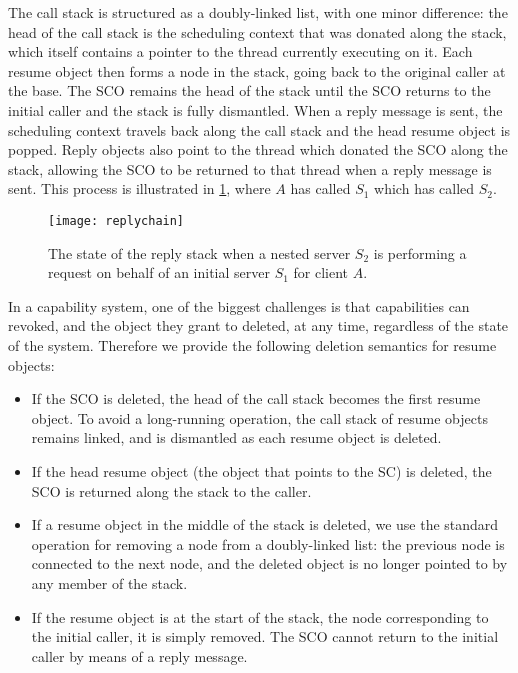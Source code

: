 The call stack is structured as a doubly-linked list, with one minor difference: the head of the
call stack is the scheduling context that was donated along the stack, which itself contains a
pointer to the thread currently executing on it. Each resume object then forms a node in the
stack, going back to the original caller at the base. The \gls{SCO} remains the head of the stack
until the \gls{SCO} returns to the initial caller and the stack is fully dismantled.  When a reply
message is sent, the scheduling context travels back along the call stack and the head resume object
is popped.  Reply objects also point to the thread which donated the \gls{SCO} along the stack,
allowing the SCO to be returned to that thread when a reply message is sent.  This process is
illustrated in \cref{f:reply-stack}, where $A$ has called $S_{1}$ which has called  $S_{2}$.

\begin{figure}[t]
    \centering
    \texttt{[image: replychain]}
    \caption[Reply stack example]{The state of the reply stack when a nested server $S_{2}$ is
performing a request on behalf of an initial server $S_{1}$ for client $A$.}
    \label{f:reply-stack}
\end{figure}

In a capability system, one of the biggest challenges is that capabilities can revoked, and the
object they grant to deleted, at any time, regardless of the state of the system. Therefore
we provide the following deletion semantics for resume objects:

\begin{itemize}
    \item If the \gls{SCO} is deleted, the head of the call stack becomes the first resume object. To avoid
        a long-running operation, the call stack of resume objects remains linked, and is dismantled
        as each resume object is deleted.
    \item If the head resume object (the object that points to the SC) is deleted, the \gls{SCO} is
        returned along the stack to the caller. 
    \item If a resume object in the middle of the stack is deleted, we use the standard operation 
        for removing
        a node from a doubly-linked list: the previous node is connected to the next node,
        and the deleted object is no longer pointed to by any member of the stack.
    \item If the resume object is at the start of the stack, \ie the node corresponding to the initial
        caller, it is simply removed. The \gls{SCO} cannot return to the initial caller by means of a reply
        message.
\end{itemize}

